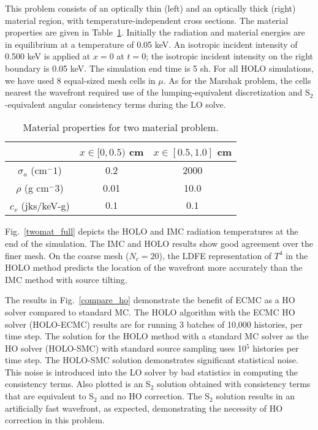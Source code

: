 This problem consists of an optically thin (left) and an optically thick (right) material region,
with temperature-independent cross sections.  The material properties are given in
Table~\ref{two_mat_props}.  Initially the radiation and material energies are in
equilibrium at a temperature of 0.05 keV.  An isotropic incident intensity of 0.500 keV
is applied at $x=0$ at $t=0$; the isotropic incident intensity on the right boundary is 0.05
keV.  The simulation end time is 5 sh. For all HOLO simulations, we have used 8
equal-sized mesh cells in $\mu$.  As for the Marshak problem, the cells nearest the wavefront required use of the lumping-equivalent discretization and
S$_2$-equivalent angular consistency terms during the LO solve.
\begin{table}[H]
        \caption{Material properties for two material problem.\label{two_mat_props}}
\centering
        \begin{tabular}{|c|cc|}  \cline{2-3}
            \multicolumn{1}{c|}{}   & $x \in [0,0.5)$ cm & $x \in [0.5,1.0]$ cm   \\ \hline
            $\sigma_a$ (cm$^-1$)  & 0.2 & 2000 \\
            $\rho$ (g cm$^-3$) & 0.01 & 10.0 \\
            $c_v$ (jks/keV-g) & $0.1$ & $0.1$ \\ \hline
        \end{tabular}
\end{table}

Fig.~\ref{twomat_full} depicts the HOLO and IMC radiation 
temperatures at the end of the simulation. The
IMC and HOLO results show good agreement
over the finer mesh.
On the coarse mesh ($N_c=20$), the LDFE representation of $T^4$ in the HOLO method predicts the location of the
wavefront more accurately than the IMC method with source tilting.

The results in Fig.~\ref{compare_ho} demonstrate the benefit of ECMC as a HO solver compared to
standard MC.  The HOLO algorithm
with the ECMC HO solver (HOLO-ECMC) results
are for running 3 batches of 10,000 histories, per time step. The solution for the HOLO method with a standard MC solver as the HO solver
(HOLO-SMC) with standard source sampling uses 10$^5$ histories per time step. The HOLO-SMC solution demonstrates significant
statistical noise.  This noise is introduced into the LO solver by bad statistics in
computing the consistency terms. Also
plotted is an S$_2$ solution obtained with consistency terms that are equivalent
to S$_2$ and no HO correction.  The S$_2$ solution results in an artificially fast
wavefront, as expected, demonstrating the necessity of HO correction in this problem.

